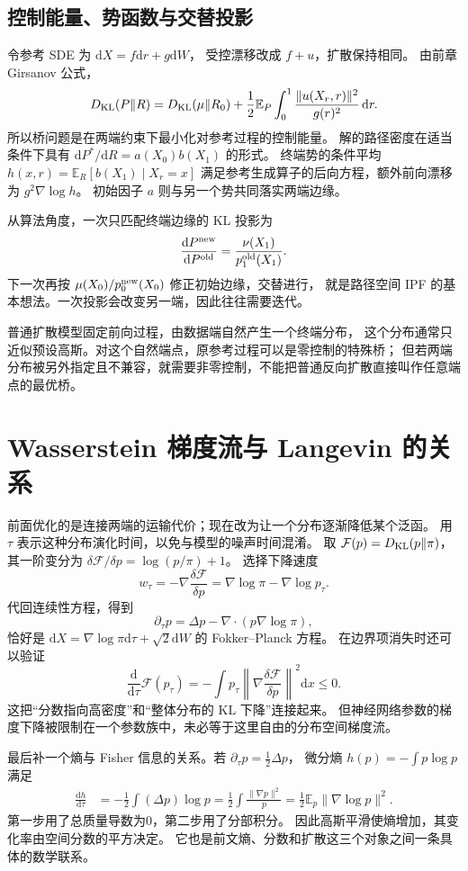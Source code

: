 \subsection{控制能量、势函数与交替投影}
令参考 SDE 为 $\mathrm dX=f\mathrm dr+g\mathrm dW$，
受控漂移改成 $f+u$，扩散保持相同。
由前章 Girsanov 公式，
\[
D_{\rm KL}(P\|R)=D_{\rm KL}(\mu\|R_0)
 +\frac12\mathbb E_P\int_0^1\frac{\|u(X_r,r)\|^2}{g(r)^2}\,\mathrm dr.
\]
所以桥问题是在两端约束下最小化对参考过程的控制能量。
解的路径密度在适当条件下具有
$\mathrm dP^*/\mathrm dR=a(X_0)b(X_1)$ 的形式。
终端势的条件平均
$h(x,r)=\mathbb E_R[b(X_1)\mid X_r=x]$
满足参考生成算子的后向方程，额外前向漂移为 $g^2\nabla\log h$。
初始因子 $a$ 则与另一个势共同落实两端边缘。

从算法角度，一次只匹配终端边缘的 KL 投影为
\[
\frac{\mathrm dP^{\rm new}}{\mathrm dP^{\rm old}}
=\frac{\nu(X_1)}{p_1^{\rm old}(X_1)}.
\]
下一次再按 $\mu(X_0)/p_0^{\rm new}(X_0)$ 修正初始边缘，交替进行，
就是路径空间 IPF 的基本想法。一次投影会改变另一端，因此往往需要迭代。

普通扩散模型固定前向过程，由数据端自然产生一个终端分布，
这个分布通常只近似预设高斯。对这个自然端点，原参考过程可以是零控制的特殊桥；
但若两端分布被另外指定且不兼容，就需要非零控制，不能把普通反向扩散直接叫作任意端点的最优桥。

\section{Wasserstein 梯度流与 Langevin 的关系}
前面优化的是连接两端的运输代价；现在改为让一个分布逐渐降低某个泛函。
用 $\tau$ 表示这种分布演化时间，以免与模型的噪声时间混淆。
取 $\mathcal F(p)=D_{\rm KL}(p\|\pi)$，其一阶变分为
$\delta\mathcal F/\delta p=\log(p/\pi)+1$。
选择下降速度
\[
w_\tau=-\nabla\frac{\delta\mathcal F}{\delta p}
=\nabla\log\pi-\nabla\log p_\tau.
\]
代回连续性方程，得到
\[
\partial_\tau p=\Delta p-\nabla\cdot(p\nabla\log\pi),
\]
恰好是 $\mathrm dX=\nabla\log\pi\mathrm d\tau+\sqrt2\mathrm dW$ 的 Fokker--Planck 方程。
在边界项消失时还可以验证
\[
\frac{\mathrm d}{\mathrm d\tau}\mathcal F(p_\tau)
=-\int p_\tau\left\|\nabla\frac{\delta\mathcal F}{\delta p}\right\|^2\mathrm dx\leq0.
\]
这把“分数指向高密度”和“整体分布的 KL 下降”连接起来。
但神经网络参数的梯度下降被限制在一个参数族中，未必等于这里自由的分布空间梯度流。

最后补一个熵与 Fisher 信息的关系。若 $\partial_\tau p=\tfrac12\Delta p$，
微分熵 $h(p)=-\int p\log p$ 满足
\begin{align}
\frac{\mathrm dh}{\mathrm d\tau}
 &=-\frac12\int(\Delta p)\log p
 =\frac12\int\frac{\|\nabla p\|^2}{p}
 =\frac12\mathbb E_p\|\nabla\log p\|^2.
\end{align}
第一步用了总质量导数为0，第二步用了分部积分。
因此高斯平滑使熵增加，其变化率由空间分数的平方决定。
它也是前文熵、分数和扩散这三个对象之间一条具体的数学联系。
